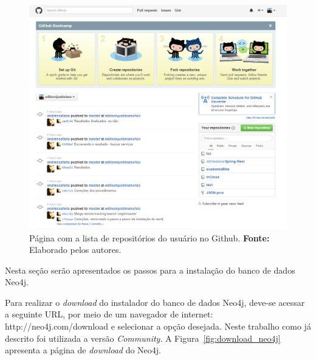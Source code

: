\newpage
\captionsetup[figure]{list=no}
\begin{figure}[h!]
	\centerline{\includegraphics[scale=0.55]{./imagens/apendices/pagina-home-github.png}}
	\caption[Página com a lista de repositórios do usuário no Github.]
	{Página com a lista de repositórios do usuário no Github. \textbf{Fonte:} Elaborado pelos autores.}
	\label{fig:ap1:pagina_home_github}
\end{figure}

 
Nesta seção serão apresentados os passos para a instalação do banco de dados Neo4j.

\par Para realizar o \textit{download} do instalador do banco de dados Neo4j, deve-se acessar a seguinte URL, por meio de um  navegador de internet: http://neo4j.com/download e selecionar a opção desejada. Neste trabalho como já descrito foi utilizada a versão \textit{Community}. A Figura~\ref{fig:download_neo4j} apresenta a página de \textit{download} do Neo4j.

